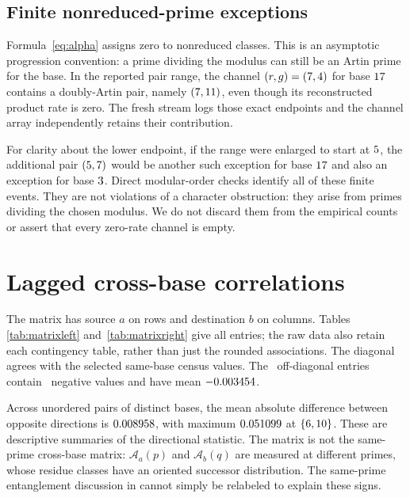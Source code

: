 \documentclass[11pt]{article}
\newcommand{\A}{\mathcal A}
\begin{document}
\subsection{Finite nonreduced-prime exceptions}
Formula~\eqref{eq:alpha} assigns zero to nonreduced classes. This is an
asymptotic progression convention: a prime dividing the modulus can still be
an Artin prime for the base. In the reported pair range, the channel
$(r,g)=(7,4)$ for base $17$ contains a doubly-Artin pair,
namely $(7,11)$, even though its reconstructed product rate is
zero. The fresh stream logs those exact endpoints and the channel array
independently retains their contribution.

For clarity about the lower endpoint, if the range were enlarged to start at
$5$, the additional pair $(5,7)$ would be another such
exception for base $17$ and also an exception for base $3$.
Direct modular-order checks identify all of these finite events. They are not
violations of a character obstruction: they arise from primes dividing the
chosen modulus. We do not discard them from the empirical counts or assert
that every zero-rate channel is empty.

\section{Lagged cross-base correlations}
The matrix has source $a$ on rows and destination $b$ on columns. Tables
\ref{tab:matrixleft} and~\ref{tab:matrixright} give all entries; the raw data
also retain each contingency table, rather than just the rounded associations.
The diagonal agrees with the selected same-base census values. The
\OffDiagonalCount\ off-diagonal entries contain \NegativeOffDiagonal\ negative
values and have mean $-0.003454$.

\begin{table}[htbp]\centering\small

\caption{Lagged matrix, first block of destination bases.
Entries are $\delta(a\mathbin{\to}b;\CensusBound)$.}\label{tab:matrixleft}
\end{table}
\begin{table}[htbp]\centering\small

\caption{Lagged matrix, remaining destination bases. Together with
Table~\ref{tab:matrixleft}, this is the full square matrix.}\label{tab:matrixright}
\end{table}

Across unordered pairs of distinct bases, the mean absolute difference between
opposite directions is $0.008958$, with maximum $0.051099$ at
$\{6,10\}$. These are descriptive summaries of the directional statistic.
The matrix is not the same-prime cross-base matrix: $\A_a(p)$ and $\A_b(q)$
are measured at different primes, whose residue classes have an oriented
successor distribution. The same-prime entanglement discussion in
\cite{baldconsolidated} cannot simply be relabeled to explain these signs.
\end{document}
